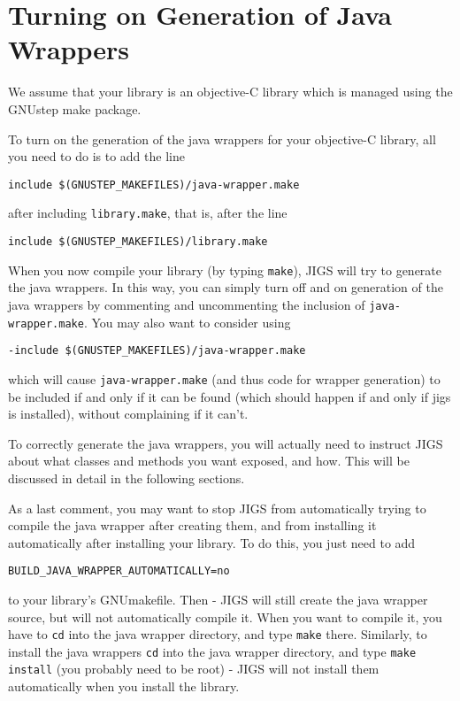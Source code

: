 \section{Turning on Generation of Java Wrappers}
We assume that your library is an objective-C library which is managed
using the GNUstep make package.

To turn on the generation of the java wrappers for your objective-C
library, all you need to do is to add the line
\begin{verbatim}
include $(GNUSTEP_MAKEFILES)/java-wrapper.make
\end{verbatim}
after including \texttt{library.make}, that is, after the line
\begin{verbatim}
include $(GNUSTEP_MAKEFILES)/library.make
\end{verbatim}

When you now compile your library (by typing \texttt{make}), JIGS will
try to generate the java wrappers.  In this way, you can simply turn
off and on generation of the java wrappers by commenting and
uncommenting the inclusion of \texttt{java-wrapper.make}.  
You may also want to consider using 
\begin{verbatim}
-include $(GNUSTEP_MAKEFILES)/java-wrapper.make
\end{verbatim}
which will cause \texttt{java-wrapper.make} (and thus code for wrapper
generation) to be included if and only if it can be found (which
should happen if and only if jigs is installed), without complaining
if it can't.

To correctly generate the java wrappers, you will actually need to
instruct JIGS about what classes and methods you want exposed, and
how.  This will be discussed in detail in the following sections.

As a last comment, you may want to stop JIGS from automatically trying
to compile the java wrapper after creating them, and from installing
it automatically after installing your library.  To do this, you just
need to add
\begin{verbatim}
BUILD_JAVA_WRAPPER_AUTOMATICALLY=no
\end{verbatim}
to your library's GNUmakefile.  Then - JIGS will still create the java
wrapper source, but will not automatically compile it.  When you want
to compile it, you have to \texttt{cd} into the java wrapper
directory, and type \texttt{make} there.  Similarly, to install the
java wrappers \texttt{cd} into the java wrapper directory, and type
\texttt{make install} (you probably need to be root) - JIGS will not 
install them automatically when you install the library.


